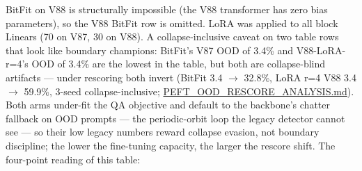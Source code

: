 \documentclass[11pt]{article}
\begin{document}
BitFit on V88 is structurally impossible (the V88 transformer has zero bias parameters), so the V88 BitFit row is omitted. LoRA was applied to all block Linears (70 on V87, 30 on V88). A collapse-inclusive caveat on two table rows that look like boundary champions: BitFit's V87 OOD of 3.4\% and V88-LoRA-r=4's OOD of 3.4\% are the lowest in the table, but both are collapse-blind artifacts --- under rescoring both invert (BitFit 3.4 $\to$ 32.8\%, LoRA r=4 V88 3.4 $\to$ 59.9\%, 3-seed collapse-inclusive; \href{https://github.com/llaa33219/MicroMixer-4/blob/4bb630413dfa58ef3141291e121ab8c006d03235/PEFT_OOD_RESCORE_ANALYSIS.md}{PEFT\_OOD\_RESCORE\_ANALYSIS.md}). Both arms under-fit the QA objective and default to the backbone's chatter fallback on OOD prompts --- the periodic-orbit loop the legacy detector cannot see --- so their low legacy numbers reward collapse evasion, not boundary discipline; the lower the fine-tuning capacity, the larger the rescore shift. The four-point reading of this table:
\end{document}
